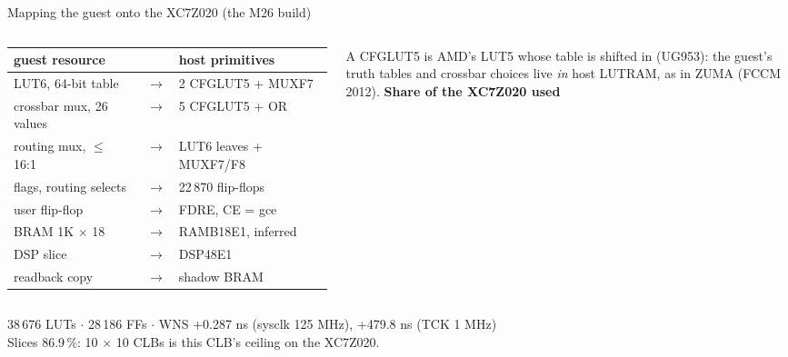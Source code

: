 \documentclass[aspectratio=169,11pt]{beamer}
\newcommand{\src}[1]{{\scriptsize\color{bobmute}#1}}
\begin{document}
\begin{frame}{Mapping the guest onto the XC7Z020 (the M26 build)}
  \begin{columns}[c]
    \scriptsize
    \renewcommand{\arraystretch}{1.25}
    \begin{tabular}{@{}lcl@{}}
      \toprule
      \textbf{guest resource} & & \textbf{host primitives} \\
      \midrule
      LUT6, 64-bit table & $\rightarrow$ & 2 CFGLUT5 + MUXF7 \\
      crossbar mux, 26 values & $\rightarrow$ & 5 CFGLUT5 + OR \\
      routing mux, $\leq$ 16:1 & $\rightarrow$ & LUT6 leaves + MUXF7/F8 \\
      flags, routing selects & $\rightarrow$ & 22\,870 flip-flops \\
      user flip-flop & $\rightarrow$ & FDRE, CE = gce \\
      BRAM 1K $\times$ 18 & $\rightarrow$ & RAMB18E1, inferred \\
      DSP slice & $\rightarrow$ & DSP48E1 \\
      readback copy & $\rightarrow$ & shadow BRAM \\
      \bottomrule
    \end{tabular}
    \vspace{2mm}

    \src{A CFGLUT5 is AMD's LUT5 whose table is shifted in (UG953): the guest's truth tables and crossbar choices live \emph{in} host LUTRAM, as in ZUMA (FCCM 2012).}
    \centering
    \textbf{\small Share of the XC7Z020 used}\\[2mm]
  \end{columns}
  \vspace{2mm}
  \centering
  \small 38\,676 LUTs $\cdot$ 28\,186 FFs $\cdot$ WNS +0.287 ns (sysclk 125 MHz), +479.8 ns (TCK 1 MHz)\\
  \alert{Slices 86.9\,\%: 10 $\times$ 10 CLBs is this CLB's ceiling on the XC7Z020.}
\end{frame}
\end{document}
